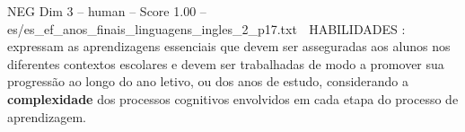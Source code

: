 \begin{textsample}{NEG Dim 3 – human – Score 1.00 – es/es\_ef\_anos\_finais\_linguagens\_ingles\_2\_p17.txt}  \label{ex:f3_neg_006}
 HABILIDADES : expressam as aprendizagens essenciais que devem ser asseguradas aos alunos nos diferentes contextos escolares e devem ser trabalhadas de modo a promover sua progressão ao longo do ano letivo, ou dos anos de estudo, considerando a \textbf{complexidade} dos processos cognitivos envolvidos em cada etapa do processo de aprendizagem.

\end{textsample}
